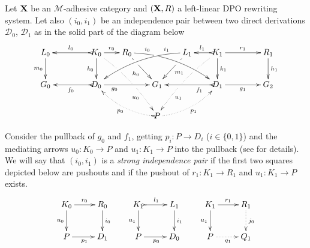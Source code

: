 \documentclass[a4paper,UKenglish,cleveref,pdftex, thm-restate,numberwithinsect,anonymous]{lipics}
\def\R{\mathsf{R}}
\def\X{\textbf {\textup{X}}}
\def\G{\textbf {\textup{G}}}
\newcommand{\dder}[1]{\mathscr{#1}}
\begin{document}
\begin{definition}
  \label{def:filler}
  Let $\X$ be an $\mathcal{M}$-adhesive category 
  and $(\X, \R)$ a left-linear DPO rewriting system. 
  Let also $(i_0, i_1)$ be an independence pair between two direct
  derivations $\dder{D}_0$, $\dder{D}_1$
  as in the solid part of the diagram below
  \[
    \xymatrix@C=18pt{L_0 \ar[d]_{m_0}&& K_0
      \ar[d]_{k_0}\ar@{>->}[ll]_{l_0} \ar[r]^{r_0} \ar@{.>}@/^.20cm/[ddrr]|(.32)\hole|(.57)\hole_(.7){u_0} & R_0
      \ar@/^.35cm/[drrr]|(.3)\hole^(.2){i_0} \ar[dr]|(.3)\hole_{h_0}
      && L_1 \ar@/_.35cm/[dlll]_(.2){i_1} \ar[dl]|(.3)\hole^{m_1}& K_1
      \ar[d]^{k_1}\ar@{>->}[l]_{l_1} \ar[rr]^{r_1} \ar@{.>}@/_.20cm/[ddll]|(.32)\hole|(.57)\hole^(.7){u_1} && R_1 \ar[d]^{h_1} \\
      G_0 &&
      \ar@{>->}[ll]^{f_0} D_0 \ar[rr]_(.3){g_0}&& G_1 &&
      \ar@{>->}[ll]^(.3){f_1} D_1 \ar[rr]_{g_1}&& G_2\\
      & & & & P \ar@/^.3cm/@{>.>}[ull]^{p_0} \ar@/_.3cm/@{.>}[urr]_{p_1}
    }
  \]

  Consider the pullback of $g_0$ and $f_1$, getting $p_i : P \to D_i$
  ($i \in \{0,1\}$) and the mediating arrows $u_0\colon K_0\to P$ and
  $u_1\colon K_1\to P$ into the pullback (see  for details). 
  We will say that $(i_0, i_1)$ is a \emph{strong independence pair} if
  the first two squares depicted  
  below are pushouts and if the pushout of $r_1 : K_1 \to R_1$ and $u_1 : K_1 \to P$ exists.
  \[
    \xymatrix{
      K_0 \ar[r]^{r_0} \ar[d]_{u_0}& R_0 \ar[d]^{i_0} & K_1
      \ar@{>->}[r]^{l_1} \ar[d]_{u_1}& L_1 \ar[d]^{i_1}
       &K_1 \ar[r]^{r_1} \ar[d]_{u_1}& R_1\ar@{.>}[d]^{j_0}
      \\
      P \ar[r]_{p_1} & D_1 &P \ar[r]_{p_0} & D_0
       & P \ar@{.>}[r]_{q_1} & Q_1
    }
  \]
\end{definition}


\end{document}
